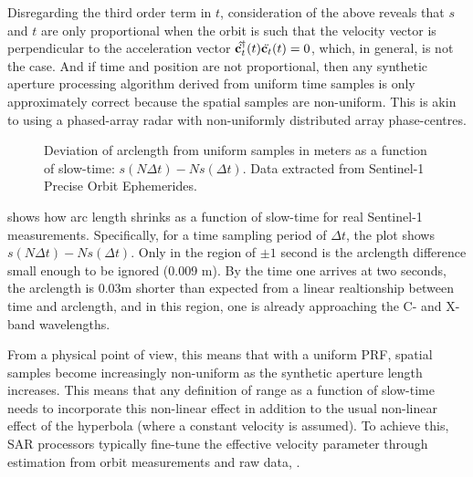 Disregarding the third order term in $t$, consideration of the above reveals that $s$ and $t$ are only proportional when the orbit is such that the velocity vector is perpendicular to the acceleration vector $\hat{\dot{\mathbf{c}_t}}^\dagger(t)\ddot{\mathbf{c}_t}(t)=0$, which, in general, is not the case. And if time and position are not proportional, then any synthetic aperture processing algorithm derived from uniform time samples is only approximately correct because the spatial samples are non-uniform. This is akin to using a phased-array radar with non-uniformly distributed array phase-centres.
\begin{figure}
    \resizebox{\textwidth}{!}{}
	\caption{Deviation of arclength from uniform samples in meters as a function of slow-time: $s(N\Delta t) - Ns(\Delta t)$. Data extracted from Sentinel-1 Precise Orbit Ephemerides.}
	\label{fg:ARCLengthError}
\end{figure}
\par
{} shows how arc length shrinks as a function of slow-time for real Sentinel-1 measurements. Specifically, for a time sampling period of $\Delta t$, the plot shows $s(N\Delta t) - Ns(\Delta t)$. Only in the region of $\pm 1$ second is the arclength difference small enough to be ignored (0.009 m). By the time one arrives at two seconds, the arclength is $0.03$m shorter than expected from a linear realtionship between time and arclength, and in this region, one is already approaching the C- and X-band wavelengths.
\par
From a physical point of view, this means that with a uniform PRF, spatial samples become increasingly non-uniform as the synthetic aperture length increases. This means that any definition of range as a function of slow-time needs to incorporate this non-linear effect in addition to the usual non-linear effect of the hyperbola (where a constant velocity is assumed). To achieve this, SAR processors typically fine-tune the effective velocity parameter through estimation from orbit measurements and raw data, \cite{Xiaojin2007, Wong2000, Liang2017}.
